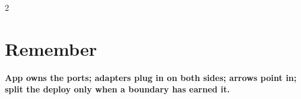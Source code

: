 \documentclass[8pt]{extarticle}
\begin{document}
\begin{multicols}{2}
\section{Remember}
\textbf{App owns the ports; adapters plug in on both sides; arrows point in; split the
deploy only when a boundary has earned it.}

\end{multicols}

\end{document}
